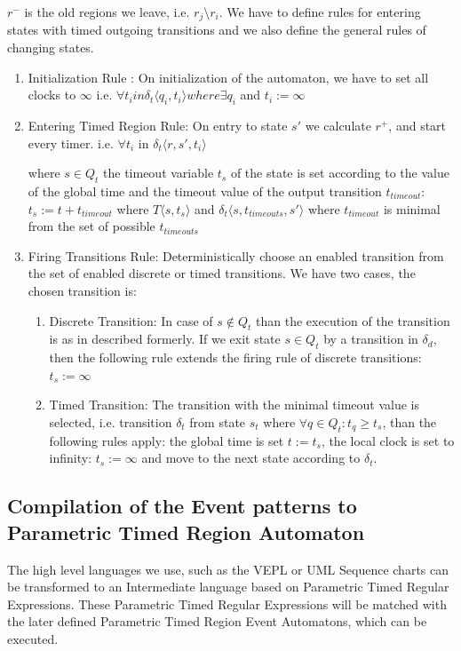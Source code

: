 			$r^-$ is the old regions we leave, i.e. $ r_j \setminus r_i $.
			We have to define rules for entering states with timed outgoing transitions and we also define the general rules of changing states. 
			\begin{enumerate}
				\item Initialization Rule : On initialization of the automaton, we have to set all clocks to $\infty$ 
					i.e. $\forall t_i in \delta_t \langle q_i, t_i \rangle where \exists q_i$ and $t_i := \infty $
			
				\item Entering Timed Region Rule: On entry to state $s'$ we calculate $r^+$, and start every timer.
					i.e. $\forall t_i$ in $\delta_t\langle r, s', t_i \rangle$  
				
				
					where $s \in Q_t$ the timeout variable $t_s$ of the state is set according to the value of the global time and the timeout value of the output transition $t_{timeout}$:
					$t_s:= t+t_{timeout}$ %
					where $T\langle s,t_s \rangle$ and $\delta_t\langle s,t_{timeouts},s' \rangle$ where $t_{timeout}$ is minimal from the set of possible $t_{timeouts}$ 
				
				\item Firing Transitions Rule: Deterministically choose an enabled transition from the set of enabled discrete or timed transitions. We have two cases, the chosen transition is:
					\begin{enumerate}
						\item Discrete Transition: In case of $s \notin Q_t$ than the execution of the transition is as in described formerly. If we exit state $s \in Q_t$ by a transition in $\delta_d$, 
						then the following rule extends the firing rule of discrete transitions:
							$t_s := \infty$
						\item Timed Transition: The transition with the minimal timeout value is selected, i.e. transition $\delta_t$ from state $s_t$ where $\forall q \in Q_t: t_q \geq t_s$, than the following rules apply:
						 the global time is set $t := t_s$, the local clock is set to infinity: $t_s := \infty$ and move to the next state according to $\delta_t$.
					\end{enumerate}			
			\end{enumerate}
			
			
		\subsection{Compilation of the Event patterns to Parametric Timed Region Automaton}
				The high level languages we use, such as the VEPL or UML Sequence charts can be transformed to an Intermediate language based on Parametric Timed Regular Expressions.
				These Parametric Timed Regular Expressions will be matched with the later defined Parametric Timed Region Event Automatons, which can be executed.

